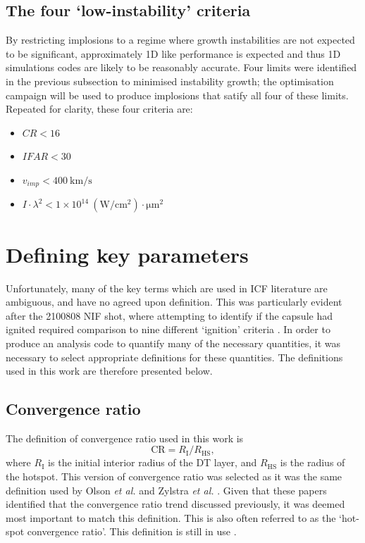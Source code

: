 \subsection{The four `low-instability' criteria}
By restricting implosions to a regime where growth instabilities are not expected to be significant, approximately 1D like performance is expected and thus 1D simulations codes are likely to be reasonably accurate. Four limits were identified in the previous subsection to minimised instability growth; the optimisation campaign will be used to produce implosions that satify all four of these limits. Repeated for clarity, these four criteria are:
\begin{itemize}
    \item $CR < 16$
    \item $IFAR < 30$
    \item $v_{imp} < 400 \: \unit{\kilo\meter\per\second}$
    \item $I \cdot \lambda^2 < 1 \times 10^{14} \: (\unit{\watt\per\centi\meter\squared}) \cdot \unit{\micro\meter\squared}$
\end{itemize}



\section{Defining key parameters}

Unfortunately, many of the key terms which are used in ICF literature are ambiguous, and have no agreed upon definition. This was particularly evident after the 2100808 NIF shot, where attempting to identify if the capsule had ignited required comparison to nine different `ignition' criteria \cite{Abu-Shawareb2022}. In order to produce an analysis code to quantify many of the necessary quantities, it was necessary to select appropriate definitions for these quantities. The definitions used in this work are therefore presented below.

\subsection{Convergence ratio}
The definition of convergence ratio used in this work is 
\begin{equation} \mathrm{CR} =  R_\mathrm{I}/R_\mathrm{HS}, \label{CR} \end{equation} 
where $R_\mathrm{I}$ is the initial interior radius of the DT layer, and $R_\mathrm{HS}$ is the radius of the hotspot. This version of convergence ratio was selected as it was the same definition used by Olson \textit{et al.} \cite{Olson2016} and Zylstra \textit{et al.} \cite{Zylstra2018}. Given that these papers identified that the convergence ratio trend discussed previously, it was deemed most important to match this definition. This is also often referred to as the `hot-spot convergence ratio'. This definition is still in use \cite{Olson2021}.

